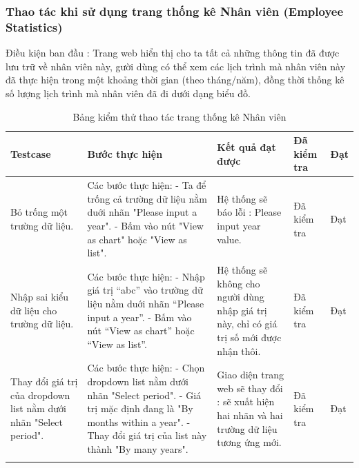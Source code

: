 \documentclass[a4paper]{article}
\begin{document}
\subsubsection{Thao tác khi sử dụng trang thống kê Nhân viên (Employee Statistics) }
Điều kiện ban đầu : Trang web hiển thị cho ta tất cả những thông tin đã được lưu trữ về nhân viên này, gười dùng có thể xem các lịch trình mà nhân viên này đã thực hiện trong một khoảng thời gian (theo tháng/năm), đồng thời thống kê số lượng lịch trình mà nhân viên đã đi dưới dạng biểu đồ. \newline
\begin{longtable}{ | p{} |p{} | p{}  | p{}  | p{}  | } 
\hline
\textbf{Testcase}& \textbf{Bước thực hiện}& \textbf{Kết quả đạt được} & \textbf{Đã kiểm tra}& \textbf{Đạt} \\ 
\hline
\hline
Bỏ trống một trường dữ liệu. &
Các bước thực hiện: \newline
- Ta để trống cả trường dữ liệu nằm duới nhãn "Please input a year". \newline
- Bấm vào nút "View as chart" hoặc "View as list".
&
Hệ thống sẽ báo lỗi : Please input year value.
 &
Đã kiểm tra &
Đạt \\

\hline
Nhập sai kiểu dữ liệu cho trường dữ liệu. &
Các bước thực hiện: \newline
- Nhập giá trị “abc” vào trường dữ liệu nằm duới nhãn “Please input a year”. \newline
- Bấm vào nút “View as chart” hoặc “View as list”.
&
Hệ thống sẽ không cho người dùng nhập giá trị này, chỉ có giá trị số mới được nhận thôi.
 &
Đã kiểm tra &
Đạt \\

\hline
Thay đổi giá trị của dropdown list nằm dưới nhãn "Select period". &
Các bước thực hiện: \newline
- Chọn dropdown list nằm dưới nhãn "Select period". \newline
- Giá trị mặc định đang là "By months within a year". \newline
- Thay đổi giá trị của list này thành "By many years".
&
Giao diện trang web sẽ thay đổi : sẽ xuất hiện hai nhãn và hai trường dữ liệu tương ứng mới.
 &
Đã kiểm tra &
Đạt \\

\hline
\caption{Bảng kiểm thử thao tác trang thống kê Nhân viên}
\end{longtable}
\end{document}
